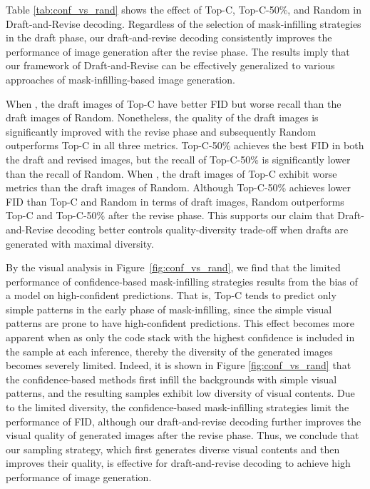 \documentclass{article}
\begin{document}
Table \ref{tab:conf_vs_rand} shows the effect of Top-C, Top-C-50\%, and Random in Draft-and-Revise decoding.
Regardless of the selection of mask-infilling strategies in the draft phase, our draft-and-revise decoding consistently improves the performance of image generation after the revise phase.
The results imply that our framework of Draft-and-Revise can be effectively generalized to various approaches of mask-infilling-based image generation.

When , the draft images of Top-C have better FID but worse recall than the draft images of Random. Nonetheless, the quality of the draft images is significantly improved with the revise phase and subsequently Random outperforms Top-C in all three metrics. Top-C-50\% achieves the best FID in both the draft and revised images, but the recall of Top-C-50\% is significantly lower than the recall of Random. When , the draft images of Top-C exhibit worse metrics than the draft images of Random. Although Top-C-50\% achieves lower FID than Top-C and Random in terms of draft images, Random outperforms Top-C and Top-C-50\% after the revise phase. This supports our claim that Draft-and-Revise decoding better controls quality-diversity trade-off when drafts are generated with maximal diversity.

By the visual analysis in Figure~\ref{fig:conf_vs_rand}, we find that the limited performance of confidence-based mask-infilling strategies results from the bias of a model on high-confident predictions.
That is, Top-C tends to predict only simple patterns in the early phase of mask-infilling, since the simple visual patterns are prone to have high-confident predictions. 
This effect becomes more apparent when  as only the code stack with the highest confidence is included in the sample at each inference, thereby the diversity of the generated images becomes severely limited. 
Indeed, it is shown in Figure \ref{fig:conf_vs_rand} that the confidence-based methods first infill the backgrounds with simple visual patterns, and the resulting samples exhibit low diversity of visual contents.
Due to the limited diversity, the confidence-based mask-infilling strategies limit the performance of FID, although our draft-and-revise decoding further improves the visual quality of generated images after the revise phase.
Thus, we conclude that our sampling strategy, which first generates diverse visual contents and then improves their quality, is effective for draft-and-revise decoding to achieve high performance of image generation.
\end{document}
